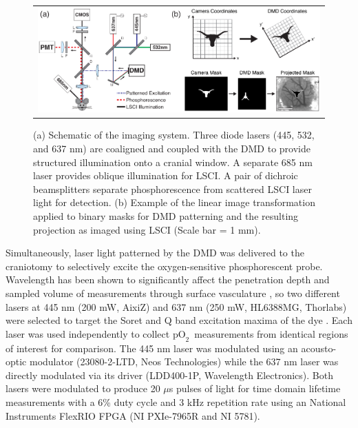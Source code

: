 \documentclass[12pt]{spieman}  %
\newcommand{\pO}{\ensuremath{\text{pO}_2}} 	            %
\begin{document}
\begin{spacing}{2}
\begin{figure}
    \begin{center}
        \begin{tabular}{c}
            \includegraphics[width=6.25in]{Figure1.pdf}
        \end{tabular}
    \end{center}
    \caption {
        \label{fig:system_schematic}
        (a) Schematic of the imaging system. Three diode lasers (445, 532, and 637 nm) are coaligned and coupled with the DMD to provide structured illumination onto a cranial window. A separate 685 nm laser provides oblique illumination for LSCI. A pair of dichroic beamsplitters separate phosphorescence from scattered LSCI laser light for detection. (b) Example of the linear image transformation applied to binary masks for DMD patterning and the resulting projection as imaged using LSCI (Scale bar = 1 mm).
    }
\end{figure}

Simultaneously, laser light patterned by the DMD was delivered to the craniotomy to selectively excite the oxygen-sensitive phosphorescent probe. Wavelength has been shown to significantly affect the penetration depth and sampled volume of measurements through surface vasculature \cite{Davis:2011wj}, so two different lasers at 445 nm (200 mW, AixiZ) and 637 nm (250 mW, HL6388MG, Thorlabs) were selected to target the Soret and Q band excitation maxima of the dye \cite{Esipova:2011hi}. Each laser was used independently to collect \pO\ measurements from identical regions of interest for comparison. The 445 nm laser was modulated using an acousto-optic modulator (23080-2-LTD, Neos Technologies) while the 637 nm laser was directly modulated via its driver (LDD400-1P, Wavelength Electronics). Both lasers were modulated to produce 20 $\mu$s pulses of light for time domain lifetime measurements with a 6\% duty cycle and 3 kHz repetition rate using an National Instruments FlexRIO FPGA (NI PXIe-7965R and NI 5781).


\end{spacing}
\end{document}
